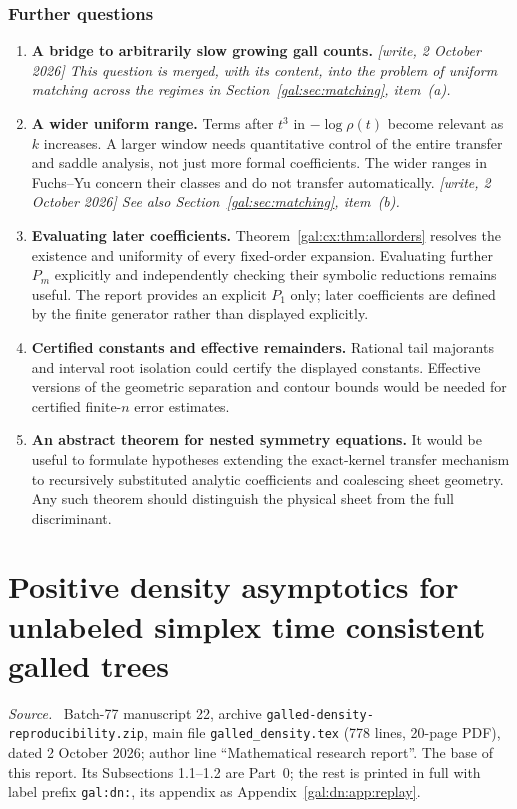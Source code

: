 \documentclass[11pt,letterpaper]{article}
\numberwithin{equation}{section}
\theoremstyle{definition}\newtheorem{definition}[theorem]{Definition}
\theoremstyle{remark}\newtheorem{remark}[theorem]{Remark}
\newenvironment{partsource}{\par\medskip\noindent\begin{minipage}{\linewidth}\small\raggedright\textit{Source.}\ }{\end{minipage}\par\medskip}
\begin{document}
\section{Further questions}\label{gal:cx:sec:questions}
\begin{enumerate}[leftmargin=*]
\item \textbf{A bridge to arbitrarily slow growing gall counts.} \emph{[write, 2 October 2026] This question is merged, with its content, into the problem of uniform matching across the regimes in Section~\ref{gal:sec:matching}, item~(a).}
\item \textbf{A wider uniform range.} Terms after $t^3$ in $-\log\rho(t)$ become relevant as $k$ increases. A larger window needs quantitative control of the entire transfer and saddle analysis, not just more formal coefficients. The wider ranges in Fuchs--Yu concern their classes and do not transfer automatically. \emph{[write, 2 October 2026] See also Section~\ref{gal:sec:matching}, item~(b).}
\item \textbf{Evaluating later coefficients.} Theorem~\ref{gal:cx:thm:allorders} resolves the existence and uniformity of every fixed-order expansion. Evaluating further $P_m$ explicitly and independently checking their symbolic reductions remains useful. The report provides an explicit $P_1$ only; later coefficients are defined by the finite generator rather than displayed explicitly.
\item \textbf{Certified constants and effective remainders.} Rational tail majorants and interval root isolation could certify the displayed constants. Effective versions of the geometric separation and contour bounds would be needed for certified finite-$n$ error estimates.
\item \textbf{An abstract theorem for nested symmetry equations.} It would be useful to formulate hypotheses extending the exact-kernel transfer mechanism to recursively substituted analytic coefficients and coalescing sheet geometry. Any such theorem should distinguish the physical sheet from the full discriminant.
\end{enumerate}

\part{Positive density asymptotics for unlabeled simplex time consistent galled trees}\label{gal:part:dn}

\begin{partsource}
Batch-77 manuscript 22, archive \texttt{galled-density-reproducibility.zip}, main file \texttt{galled\_density.tex} (778 lines, 20-page PDF), dated 2 October 2026; author line ``Mathematical research report''. The base of this report. Its Subsections 1.1--1.2 are Part~0; the rest is printed in full with label prefix \texttt{gal:dn:}, its appendix as Appendix~\ref{gal:dn:app:replay}.
\end{partsource}
\end{document}
